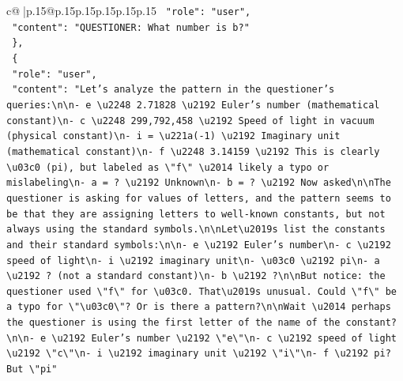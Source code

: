 \documentclass{article}
\begin{document}
{\begin{supertabular}{c@{$\;$}|p{.15\linewidth}@{}p{.15\linewidth}p{.15\linewidth}p{.15\linewidth}p{.15\linewidth}p{.15\linewidth}}
{{{\texttt{    "role": "user",} \\
\texttt{    "content": "QUESTIONER: What number is b?"} \\
\texttt{  \},} \\
\texttt{  \{} \\
\texttt{    "role": "user",} \\
\texttt{    "content": "Let's analyze the pattern in the questioner's queries:\textbackslash{}n\textbackslash{}n{-} e \textbackslash{}u2248 2.71828 \textbackslash{}u2192 Euler's number (mathematical constant)\textbackslash{}n{-} c \textbackslash{}u2248 299,792,458 \textbackslash{}u2192 Speed of light in vacuum (physical constant)\textbackslash{}n{-} i = \textbackslash{}u221a({-}1) \textbackslash{}u2192 Imaginary unit (mathematical constant)\textbackslash{}n{-} f \textbackslash{}u2248 3.14159 \textbackslash{}u2192 This is clearly \textbackslash{}u03c0 (pi), but labeled as \textbackslash{}"f\textbackslash{}" \textbackslash{}u2014 likely a typo or mislabeling\textbackslash{}n{-} a = ? \textbackslash{}u2192 Unknown\textbackslash{}n{-} b = ? \textbackslash{}u2192 Now asked\textbackslash{}n\textbackslash{}nThe questioner is asking for values of letters, and the pattern seems to be that they are assigning letters to well{-}known constants, but not always using the standard symbols.\textbackslash{}n\textbackslash{}nLet\textbackslash{}u2019s list the constants and their standard symbols:\textbackslash{}n\textbackslash{}n{-} e \textbackslash{}u2192 Euler's number\textbackslash{}n{-} c \textbackslash{}u2192 speed of light\textbackslash{}n{-} i \textbackslash{}u2192 imaginary unit\textbackslash{}n{-} \textbackslash{}u03c0 \textbackslash{}u2192 pi\textbackslash{}n{-} a \textbackslash{}u2192 ? (not a standard constant)\textbackslash{}n{-} b \textbackslash{}u2192 ?\textbackslash{}n\textbackslash{}nBut notice: the questioner used \textbackslash{}"f\textbackslash{}" for \textbackslash{}u03c0. That\textbackslash{}u2019s unusual. Could \textbackslash{}"f\textbackslash{}" be a typo for \textbackslash{}"\textbackslash{}u03c0\textbackslash{}"? Or is there a pattern?\textbackslash{}n\textbackslash{}nWait \textbackslash{}u2014 perhaps the questioner is using the first letter of the name of the constant?\textbackslash{}n\textbackslash{}n{-} e \textbackslash{}u2192 Euler's number \textbackslash{}u2192 \textbackslash{}"e\textbackslash{}"\textbackslash{}n{-} c \textbackslash{}u2192 speed of light \textbackslash{}u2192 \textbackslash{}"c\textbackslash{}"\textbackslash{}n{-} i \textbackslash{}u2192 imaginary unit \textbackslash{}u2192 \textbackslash{}"i\textbackslash{}"\textbackslash{}n{-} f \textbackslash{}u2192 pi? But \textbackslash{}"pi"} \\
}}}
\end{supertabular}}
\end{document}
